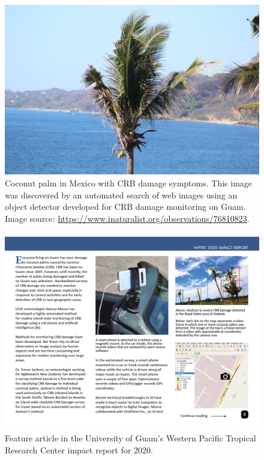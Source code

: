 \documentclass[11pt,english,letterpaper]{scrartcl}
\begin{document}
\begin{figure}[H]
	\centering
	\includegraphics[width=0.7\linewidth]{images/crb-mexico}
	\caption{Coconut palm in Mexico with CRB damage symptoms. This image was discovered by an automated search of web images using an object detector developed for CRB damage monitoring on Guam. Image source: \url{https://www.inaturalist.org/observations/76810823}.}	
	\label{fig:crb-mexico}
\end{figure}

\begin{figure}[H]
	\centering
	\includegraphics[width=\linewidth]{images/impact-report08.png}
	\caption{Feature article in the University of Guam's Western Pacific Tropical Research Center impact report for 2020.}
	\label{fig:roadside1-2}
\end{figure}
\end{document}
